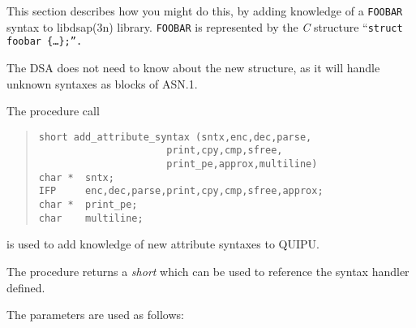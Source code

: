 This section describes how you might do this, by adding knowledge
of a \verb"FOOBAR" syntax to \man libdsap(3n) library.
\verb"FOOBAR" is represented by the {\em C} structure
``\tt struct foobar \{\ldots\};\rm ''.

The DSA does not need to know about the new structure, as it will
handle unknown syntaxes as blocks of ASN.1.

The procedure call
\begin{quote}\small\begin{verbatim}
short add_attribute_syntax (sntx,enc,dec,parse,
                      print,cpy,cmp,sfree,
                      print_pe,approx,multiline)
char *  sntx;
IFP     enc,dec,parse,print,cpy,cmp,sfree,approx;
char *  print_pe;
char    multiline;
\end{verbatim}\end{quote}
is used to add knowledge of new attribute syntaxes to QUIPU.

The procedure returns a {\em short} which can be used to reference the
syntax handler defined.

The parameters are used as follows:

